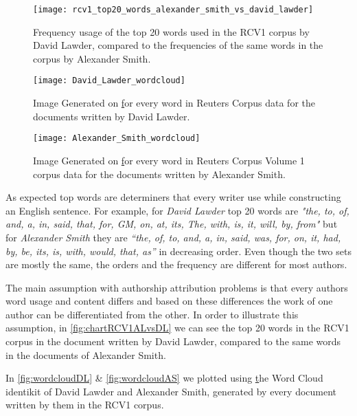 \begin{figure}[ht]
	\centering
	\texttt{[image: rcv1\_top20\_words\_alexander\_smith\_vs\_david\_lawder]}
	\caption[David Lawder vs Alexander Smith top 20 words]{Frequency usage of the top 20 words used in the RCV1 corpus by David Lawder, compared to the frequencies of the same words in the corpus by Alexander Smith.}
	\label{fig:chartRCV1ALvsDL}
\end{figure}

\begin{figure}[ht]
	\centering
	\texttt{[image: David\_Lawder\_wordcloud]}
	\caption[David Lawder WordCloud in Reuters Corpus]{Image Generated on \href{wordclouds.com} for every word in Reuters Corpus data for the documents written by David Lawder.}
	\label{fig:wordcloudDL}
\end{figure}

\begin{figure}[ht]
	\centering
	\texttt{[image: Alexander\_Smith\_wordcloud]}
	\caption[Alexander Smith WordCloud in Reuters Corpus Volume 1]{Image Generated on \href{wordclouds.com} for every word in Reuters Corpus Volume 1 corpus data for the documents written by Alexander Smith.}
	\label{fig:wordcloudAS}
\end{figure}

As expected top words are determiners that every writer use while constructing an English sentence. For example, for \textit{David Lawder} top 20 words are \textit{"the, to, of, and, a, in, said, that, for, GM, on, at, its, The, with, is, it, will, by, from"} but for \textit{Alexander Smith} they are \textit{\enquote{the, of, to, and, a, in, said, was, for, on, it, had, by, be, its, is, with, would, that, as}} in decreasing order. Even though the two sets are mostly the same, the orders and the frequency are different for most authors.

The main assumption with authorship attribution problems is that every authors word usage and content differs and based on these differences the work of one author can be differentiated from the other. In order to illustrate this assumption, in \autoref{fig:chartRCV1ALvsDL} we can see the top 20 words in the RCV1 corpus in the document written by David Lawder, compared to the same words in the documents of Alexander Smith.

In \autoref{fig:wordcloudDL} \& \autoref{fig:wordcloudAS} we plotted using \href{wordclouds.com} the Word Cloud identikit of David Lawder and Alexander Smith, generated by every document written by them in the RCV1 corpus.


